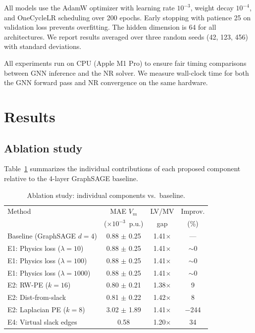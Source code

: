 \documentclass[preprint,review,12pt]{elsarticle}
\begin{document}
All models use the AdamW optimizer with learning rate $10^{-3}$, weight decay $10^{-4}$, and OneCycleLR scheduling over 200 epochs. Early stopping with patience 25 on validation loss prevents overfitting. The hidden dimension is 64 for all architectures. We report results averaged over three random seeds (42, 123, 456) with standard deviations.

All experiments run on CPU (Apple M1 Pro) to ensure fair timing comparisons between GNN inference and the NR solver. We measure wall-clock time for both the GNN forward pass and NR convergence on the same hardware.

\section{Results}
\label{sec:results}

\subsection{Ablation study}
\label{sec:results_ablation}

Table~\ref{tab:ablation} summarizes the individual contributions of each proposed component relative to the 4-layer GraphSAGE baseline.

\begin{table}[!t]
\renewcommand{\arraystretch}{1.1}
\caption{Ablation study: individual components vs.\ baseline.}
\label{tab:ablation}
\centering
\begin{tabular}{lccc}
\toprule
Method & MAE $V_m$ & LV/MV & Improv. \\
 & ($\times 10^{-3}$~p.u.) & gap & (\%) \\
\midrule
Baseline (GraphSAGE $d{=}4$) & 0.88 $\pm$ 0.25 & 1.41$\times$ & --- \\
\midrule
E1: Physics loss ($\lambda{=}10$) & 0.88 $\pm$ 0.25 & 1.41$\times$ & ${\sim}$0 \\
E1: Physics loss ($\lambda{=}100$) & 0.88 $\pm$ 0.25 & 1.41$\times$ & ${\sim}$0 \\
E1: Physics loss ($\lambda{=}1000$) & 0.88 $\pm$ 0.25 & 1.41$\times$ & ${\sim}$0 \\
\midrule
E2: RW-PE ($k{=}16$) & 0.80 $\pm$ 0.21 & 1.38$\times$ & 9 \\
E2: Dist-from-slack & 0.81 $\pm$ 0.22 & 1.42$\times$ & 8 \\
E2: Laplacian PE ($k{=}8$) & 3.02 $\pm$ 1.89 & 1.41$\times$ & $-$244 \\
\midrule
E4: Virtual slack edges & 0.58 & 1.20$\times$ & 34 \\
\bottomrule
\end{tabular}
\end{table}
\end{document}
